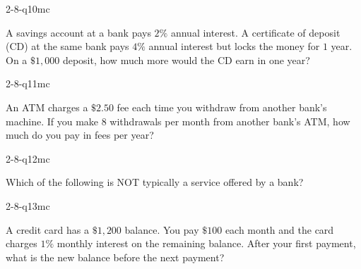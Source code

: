 \begin{practiceQuestion}{2-8-q10}{mc}
\begin{questionText}
A savings account at a bank pays $2\%$ annual interest. A certificate of deposit (CD) at the same bank pays $4\%$ annual interest but locks the money for $1$ year. On a $\$1{,}000$ deposit, how much more would the CD earn in one year?
\end{questionText}
\end{practiceQuestion}

\begin{practiceQuestion}{2-8-q11}{mc}
\begin{questionText}
An ATM charges a $\$2.50$ fee each time you withdraw from another bank's machine. If you make $8$ withdrawals per month from another bank's ATM, how much do you pay in fees per year?
\end{questionText}
\end{practiceQuestion}

\begin{practiceQuestion}{2-8-q12}{mc}
\begin{questionText}
Which of the following is NOT typically a service offered by a bank?
\end{questionText}
\end{practiceQuestion}

\begin{practiceQuestion}{2-8-q13}{mc}
\begin{questionText}
A credit card has a $\$1{,}200$ balance. You pay $\$100$ each month and the card charges $1\%$ monthly interest on the remaining balance. After your first payment, what is the new balance before the next payment?
\end{questionText}
\end{practiceQuestion}


